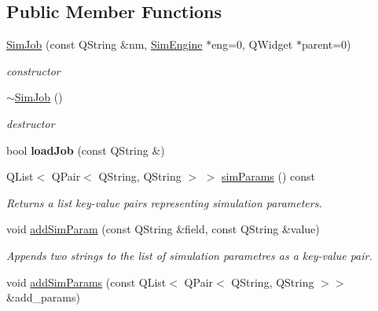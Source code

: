 \subsection*{Public Member Functions}
\begin{DoxyCompactItemize}
\item 
\hyperlink{classprim_1_1SimJob_a02d4da7a34bab9be33f7cc3b3b787b37}{Sim\+Job} (const Q\+String \&nm, \hyperlink{classprim_1_1SimEngine}{Sim\+Engine} $\ast$eng=0, Q\+Widget $\ast$parent=0)\hypertarget{classprim_1_1SimJob_a02d4da7a34bab9be33f7cc3b3b787b37}{}\label{classprim_1_1SimJob_a02d4da7a34bab9be33f7cc3b3b787b37}

\begin{DoxyCompactList}\small\item\em constructor \end{DoxyCompactList}\item 
\hyperlink{classprim_1_1SimJob_ae2460c40ea297620657438db02624acd}{$\sim$\+Sim\+Job} ()\hypertarget{classprim_1_1SimJob_ae2460c40ea297620657438db02624acd}{}\label{classprim_1_1SimJob_ae2460c40ea297620657438db02624acd}

\begin{DoxyCompactList}\small\item\em destructor \end{DoxyCompactList}\item 
bool {\bfseries load\+Job} (const Q\+String \&)\hypertarget{classprim_1_1SimJob_ac40a88aeedd4c729378d9019f9531329}{}\label{classprim_1_1SimJob_ac40a88aeedd4c729378d9019f9531329}

\item 
Q\+List$<$ Q\+Pair$<$ Q\+String, Q\+String $>$ $>$ \hyperlink{classprim_1_1SimJob_ac21c103fead05aefb12fbb01b3f74cb3}{sim\+Params} () const \hypertarget{classprim_1_1SimJob_ac21c103fead05aefb12fbb01b3f74cb3}{}\label{classprim_1_1SimJob_ac21c103fead05aefb12fbb01b3f74cb3}

\begin{DoxyCompactList}\small\item\em Returns a list key-\/value pairs representing simulation parameters. \end{DoxyCompactList}\item 
void \hyperlink{classprim_1_1SimJob_ae7e85764e78faa72728820c794c8f478}{add\+Sim\+Param} (const Q\+String \&field, const Q\+String \&value)\hypertarget{classprim_1_1SimJob_ae7e85764e78faa72728820c794c8f478}{}\label{classprim_1_1SimJob_ae7e85764e78faa72728820c794c8f478}

\begin{DoxyCompactList}\small\item\em Appends two strings to the list of simulation parametres as a key-\/value pair. \end{DoxyCompactList}\item 
void \hyperlink{classprim_1_1SimJob_a2e026d103848a8fb2dc500748a647b32}{add\+Sim\+Params} (const Q\+List$<$ Q\+Pair$<$ Q\+String, Q\+String $>$$>$ \&add\+\_\+params)\hypertarget{classprim_1_1SimJob_a2e026d103848a8fb2dc500748a647b32}{}\label{classprim_1_1SimJob_a2e026d103848a8fb2dc500748a647b32}


\end{DoxyCompactItemize}
